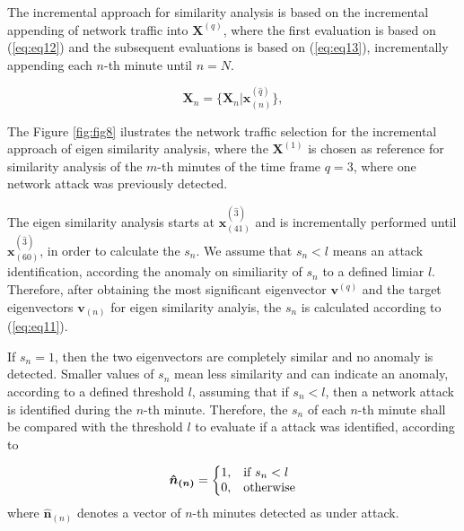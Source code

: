 \documentclass{bmcart}
\begin{document}
The incremental approach for similarity analysis is based on the incremental appending of network traffic into $\boldsymbol{X}^{(q)}$, where the first evaluation is based on (\ref{eq:eq12}) and the subsequent evaluations is based on (\ref{eq:eq13}), incrementally appending each $n$-th minute until $n=N$.

\begin{equation}\label{eq:eq13}
\boldsymbol{X}_{n} = \{\boldsymbol{X}_{n} | \boldsymbol{x}^{(\hat{q})}_{(n)}\},
\end{equation}

The Figure \ref{fig:fig8} ilustrates the network traffic selection for the incremental approach of eigen similarity analysis, where the $\boldsymbol{X}^{(1)}$ is chosen as reference for similarity analysis of the $m$-th minutes of the time frame $q=3$, where one network attack was previously detected. 


The eigen similarity analysis starts at $\boldsymbol{x}^{(\hat{3})}_{(41)}$ and is incrementally performed until $\boldsymbol{x}^{(\hat{3})}_{(60)}$, in order to calculate the $s_n$. We assume that $s_n < l$ means an attack identification, according the anomaly on similiarity of $s_n$ to a defined limiar $l$. Therefore, after obtaining the most significant eigenvector $\boldsymbol{v}^{(q)}$ and the target eigenvectors $\boldsymbol{v}_{(n)}$ for eigen similarity analyis, the $s_n$ is calculated according to (\ref{eq:eq11}).

If $s_n = 1$, then the two eigenvectors are completely similar and no anomaly is detected. Smaller values of $s_n$ mean less similarity and can indicate an anomaly, according to a defined 
threshold $l$, assuming that if $s_n < l$, then a network attack is identified during the $n$-th minute. Therefore, the $s_n$ of each $n$-th minute shall be compared with the threshold $l$ to evaluate if a attack was identified, according to

\begin{equation}\label{eq:eq14}
  \boldsymbol{\hat{n}_{(n)}}=\left\{
  \begin{array}{@{}ll@{}}
    1, & \text{if}\ s_n < l \\
    0, & \text{otherwise}
  \end{array}\right.
\end{equation}
where $\boldsymbol{\hat{n}}_{(n)}$ denotes a vector of $n$-th minutes detected as under attack.
\end{document}
